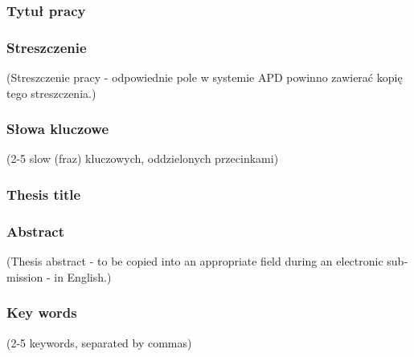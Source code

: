 \documentclass[a4paper,twoside,12pt]{book}
\begin{document}


\cleardoublepage

\rmfamily\normalfont
\pagestyle{empty}



\subsubsection*{Tytuł pracy}
\Title

\subsubsection*{Streszczenie}
(Streszczenie pracy - odpowiednie pole w systemie APD powinno zawierać kopię tego streszczenia.)

\subsubsection*{Słowa kluczowe}
(2-5 slow (fraz) kluczowych, oddzielonych przecinkami)

\subsubsection*{Thesis title}
\begin{otherlanguage}{british}
	\TitleAlt
\end{otherlanguage}

\subsubsection*{Abstract}
\begin{otherlanguage}{british}
	(Thesis abstract - to be copied into an appropriate field during an electronic submission - in English.)
\end{otherlanguage}
\subsubsection*{Key words}
\begin{otherlanguage}{british}
	(2-5 keywords, separated by commas)
\end{otherlanguage}
\end{document}

